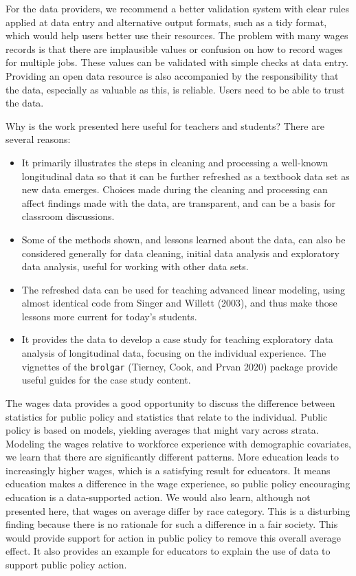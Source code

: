 \documentclass[12pt]{article}
\providecommand{\tightlist}{%
  \setlength{\itemsep}{0pt}\setlength{\parskip}{0pt}}
\begin{document}
For the data providers, we recommend a better validation system with clear rules applied at data entry and alternative output formats, such as a tidy format, which would help users better use their resources. The problem with many wages records is that there are implausible values or confusion on how to record wages for multiple jobs. These values can be validated with simple checks at data entry. Providing an open data resource is also accompanied by the responsibility that the data, especially as valuable as this, is reliable. Users need to be able to trust the data.

Why is the work presented here useful for teachers and students? There are several reasons:

\begin{itemize}
\tightlist
\item
  It primarily illustrates the steps in cleaning and processing a well-known longitudinal data so that it can be further refreshed as a textbook data set as new data emerges. Choices made during the cleaning and processing can affect findings made with the data, are transparent, and can be a basis for classroom discussions.
\item
  Some of the methods shown, and lessons learned about the data, can also be considered generally for data cleaning, initial data analysis and exploratory data analysis, useful for working with other data sets.
\item
  The refreshed data can be used for teaching advanced linear modeling, using almost identical code from Singer and Willett (2003), and thus make those lessons more current for today's students.
\item
  It provides the data to develop a case study for teaching exploratory data analysis of longitudinal data, focusing on the individual experience. The vignettes of the \texttt{brolgar} (Tierney, Cook, and Prvan 2020) package provide useful guides for the case study content.
\end{itemize}

The wages data provides a good opportunity to discuss the difference between statistics for public policy and statistics that relate to the individual. Public policy is based on models, yielding averages that might vary across strata. Modeling the wages relative to workforce experience with demographic covariates, we learn that there are significantly different patterns. More education leads to increasingly higher wages, which is a satisfying result for educators. It means education makes a difference in the wage experience, so public policy encouraging education is a data-supported action. We would also learn, although not presented here, that wages on average differ by race category. This is a disturbing finding because there is no rationale for such a difference in a fair society. This would provide support for action in public policy to remove this overall average effect. It also provides an example for educators to explain the use of data to support public policy action.
\end{document}
